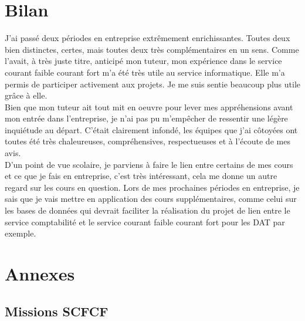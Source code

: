 \documentclass{article}
\begin{document}
\pagebreak
\section{Bilan}
    J'ai passé deux périodes en entreprise extrêmement enrichissantes. Toutes deux bien 
    distinctes, certes, mais toutes deux très complémentaires en un sens. Comme l'avait, à 
    très juste titre, anticipé mon tuteur, mon expérience dans le service courant faible courant 
    fort m'a été très utile au service informatique. Elle m'a permis de participer activement aux 
    projets. Je me suis sentie beaucoup plus utile grâce à elle.\\
    Bien que mon tuteur ait tout mit en oeuvre pour lever mes appréhensions avant mon entrée dans l'entreprise, 
    je n'ai pas pu m'empêcher de ressentir une légère inquiétude au départ.
    C'était clairement infondé, les équipes que j'ai côtoyées ont toutes été très chaleureuses,
    compréhensives, respectueuses et à l'écoute de mes avis.\\
    D'un point de vue scolaire, je parviens à faire le lien entre certains de mes cours et ce 
    que je fais en entreprise, 
    c'est très intéressant, cela me donne un autre regard sur les cours en question. Lors de mes 
    prochaines périodes en entreprise, je sais que je vais mettre en application des cours 
    supplémentaires, comme celui sur les bases de données qui devrait faciliter la réalisation du projet 
    de lien entre le service comptabilité et le service courant faible courant fort pour les DAT par exemple.\\
    
    
\pagebreak
\section{Annexes}
    
    \subsection{Missions SCFCF}
\end{document}
